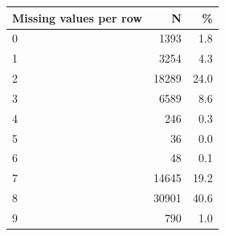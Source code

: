 \begin{threeparttable}


\begin{tabular}{@{}lrr@{}}


\toprule


\textbf{Missing values per row} & \textbf{N} & \textbf{\%} \\


\midrule


\midrule
0           &        1393&         1.8\\
1           &        3254&         4.3\\
2           &       18289&        24.0\\
3           &        6589&         8.6\\
4           &         246&         0.3\\
5           &          36&         0.0\\
6           &          48&         0.1\\
7           &       14645&        19.2\\
8           &       30901&        40.6\\
9           &         790&         1.0\\
\bottomrule


\end{tabular}


\end{threeparttable}
